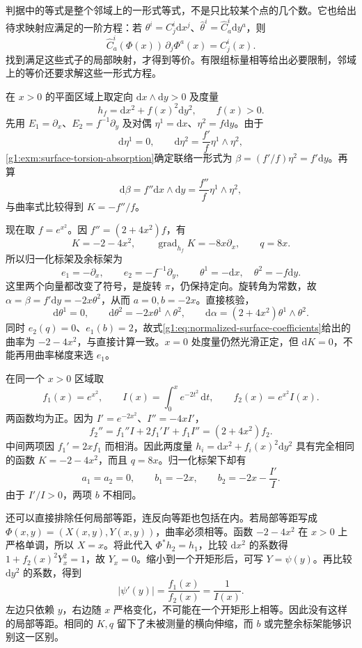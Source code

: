 判据中的等式是整个邻域上的一形式等式，不是只比较某个点的几个数。它也给出待求映射应满足的一阶方程：若 \(\theta^i=C^i_j\mathrm{d}x^j\)、\(\widehat\theta^i=\widehat C^i_a\mathrm{d}y^a\)，则
\[
	\widehat C^i_a(\Phi(x))\,\partial_j\Phi^a(x)=C^i_j(x).
\]
找到满足这些式子的局部映射，才得到等价。有限组标量相等给出必要限制，邻域上的等价还要求解这些一形式方程。

\begin{example}\label{g1:exm:normalized-warped-surface}
	在 \(x>0\) 的平面区域上取定向 \(\mathrm{d}x\wedge\mathrm{d}y>0\) 及度量
	\[
		h_f=\mathrm{d}x^2+f(x)^2\mathrm{d}y^2,\qquad f(x)>0.
	\]
	先用 \(E_1=\partial_x\)、\(E_2=f^{-1}\partial_y\) 及对偶 \(\eta^1=\mathrm{d}x\)、\(\eta^2=f\mathrm{d}y\)。由于
	\[
		\mathrm{d}\eta^1=0,\qquad
		\mathrm{d}\eta^2=\frac{f'}f\eta^1\wedge\eta^2,
	\]
	\cref{g1:exm:surface-torsion-absorption}确定联络一形式为 \(\beta=(f'/f)\eta^2=f'\mathrm{d}y\)。再算
	\[
		\mathrm{d}\beta=f''\mathrm{d}x\wedge\mathrm{d}y
		=\frac{f''}f\eta^1\wedge\eta^2,
	\]
	与曲率式比较得到 \(K=-f''/f\)。

	现在取 \(f=e^{x^2}\)。因 \(f''=(2+4x^2)f\)，有
	\[
		K=-2-4x^2,\qquad\operatorname{grad}_{h_f}K=-8x\partial_x,
		\qquad q=8x.
	\]
	所以归一化标架及余标架为
	\[
		e_1=-\partial_x,\qquad e_2=-f^{-1}\partial_y,
		\qquad \theta^1=-\mathrm{d}x,\quad\theta^2=-f\mathrm{d}y.
	\]
	这里两个向量都改变了符号，是旋转 \(\pi\)，仍保持定向。旋转角为常数，故 \(\alpha=\beta=f'\mathrm{d}y=-2x\theta^2\)，从而 \(a=0,b=-2x\)。直接核验，
	\[
		\mathrm{d}\theta^1=0,\qquad
		\mathrm{d}\theta^2=-2x\theta^1\wedge\theta^2,
		\qquad \mathrm{d}\alpha=(2+4x^2)\theta^1\wedge\theta^2.
	\]
	同时 \(e_2(q)=0\)、\(e_1(b)=2\)，故式\eqref{g1:eq:normalized-surface-coefficients}给出的曲率为 \(-2-4x^2\)，与直接计算一致。\(x=0\) 处度量仍然光滑正定，但 \(\mathrm{d}K=0\)，不能再用曲率梯度来选 \(e_1\)。
\end{example}

\begin{example}\label{g1:exm:same-curvature-different-metrics}
	在同一个 \(x>0\) 区域取
	\[
		f_1(x)=e^{x^2},\qquad
		I(x)=\int_0^x e^{-2t^2}\,\mathrm{d}t,\qquad
		f_2(x)=e^{x^2}I(x).
	\]
	两函数均为正。因为 \(I'=e^{-2x^2}\)、\(I''=-4xI'\)，
	\[
		f_2''=f_1''I+2f_1'I'+f_1I''
		=(2+4x^2)f_2.
	\]
	中间两项因 \(f_1'=2xf_1\) 而相消。因此两度量 \(h_i=\mathrm{d}x^2+f_i(x)^2\mathrm{d}y^2\) 具有完全相同的函数 \(K=-2-4x^2\)，而且 \(q=8x\)。归一化标架下却有
	\[
		a_1=a_2=0,\qquad b_1=-2x,\qquad
		b_2=-2x-\frac{I'}I.
	\]
	由于 \(I'/I>0\)，两项 \(b\) 不相同。

	还可以直接排除任何局部等距，连反向等距也包括在内。若局部等距写成 \(\Phi(x,y)=(X(x,y),Y(x,y))\)，曲率必须相等。函数 \(-2-4x^2\) 在 \(x>0\) 上严格单调，所以 \(X=x\)。将此代入 \(\Phi^*h_2=h_1\)，比较 \(\mathrm{d}x^2\) 的系数得 \(1+f_2(x)^2Y_x^2=1\)，故 \(Y_x=0\)。缩小到一个开矩形后，可写 \(Y=\psi(y)\)。再比较 \(\mathrm{d}y^2\) 的系数，得到
	\[
		|\psi'(y)|=\frac{f_1(x)}{f_2(x)}=\frac1{I(x)}.
	\]
	左边只依赖 \(y\)，右边随 \(x\) 严格变化，不可能在一个开矩形上相等。因此没有这样的局部等距。相同的 \(K,q\) 留下了未被测量的横向伸缩，而 \(b\) 或完整余标架能够识别这一区别。
\end{example}

